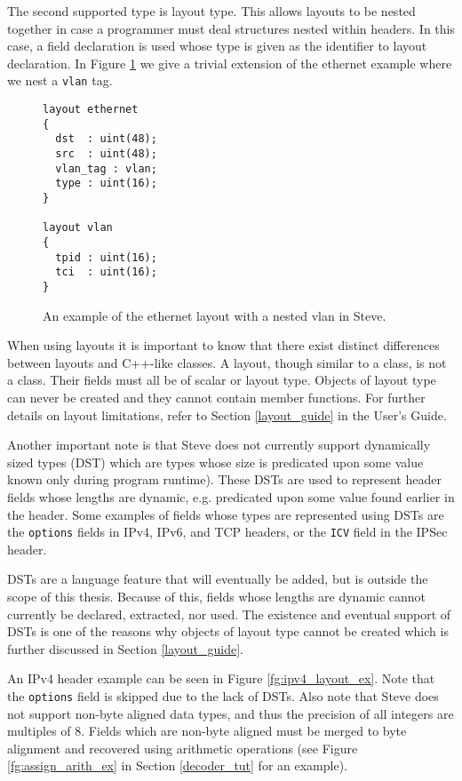 The second supported type is layout type. This allows layouts to be nested together in case a programmer must deal structures nested within headers. In this case, a field declaration is used whose type is given as the identifier to layout declaration. In Figure \ref{fg:nested_layout_ex} we give a trivial extension of the ethernet example where we nest a \texttt{vlan} tag.

\begin{figure}[ht]
\begin{lstlisting}
layout ethernet
{
  dst  : uint(48);
  src  : uint(48);
  vlan_tag : vlan;
  type : uint(16);
}

layout vlan
{
  tpid : uint(16);
  tci  : uint(16);
}
\end{lstlisting}
\caption{An example of the ethernet layout with a nested vlan in Steve.}
\label{fg:nested_layout_ex}
\end{figure}

When using layouts it is important to know that there exist distinct differences between layouts and C++-like classes. A layout, though similar to a class, is not a class. Their fields must all be of scalar or layout type. Objects of layout type can never be created and they cannot contain member functions. For further details on layout limitations, refer to Section \ref{layout_guide} in the User's Guide.

Another important note is that Steve does not currently support dynamically sized types (DST) which are types whose size is predicated upon some value known only during program runtime). These DSTs are used to represent header fields whose lengths are dynamic, e.g. predicated upon some value found earlier in the header. Some examples of fields whose types are represented using DSTs are the \texttt{options} fields in IPv4, IPv6, and TCP headers, or the \texttt{ICV} field in the IPSec header.

DSTs are a language feature that will eventually be added, but is outside the scope of this thesis. Because of this, fields whose lengths are dynamic cannot currently be declared, extracted, nor used. The existence and eventual support of DSTs is one of the reasons why objects of layout type cannot be created which is further discussed in Section \ref{layout_guide}.

An IPv4 header example can be seen in Figure \ref{fg:ipv4_layout_ex}. Note that the \texttt{options} field is skipped due to the lack of DSTs. Also note that Steve does not support non-byte aligned data types, and thus the precision of all integers are multiples of 8. Fields which are non-byte aligned must be merged to byte alignment and recovered using arithmetic operations (see Figure \ref{fg:assign_arith_ex} in Section \ref{decoder_tut} for an example). 

